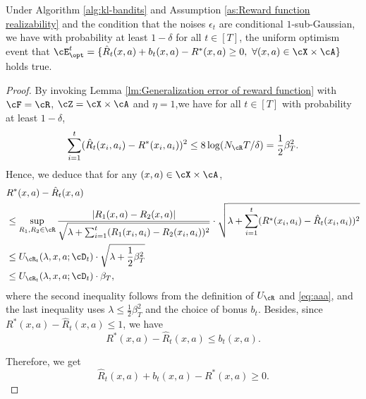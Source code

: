 \documentclass[11pt]{article}
\begin{document}
\begin{lemma}\label{lm:Confidence Bound for Reward Function}
    Under Algorithm \ref{alg:kl-bandits} and Assumption \ref{as:Reward function realizability} and the condition that the noises $\epsilon_t$ are conditional $1$-sub-Gaussian, we have with probability at least $1-\delta$ for all $t\in[T]$, the uniform optimism event that $\cE_{\opt}^t=\{\hat{R}_t(x,a)+b_t(x,a)-R^*(x,a) \ge 0,~\forall(x,a)\in\cX\times\cA\}$ holds true.
\end{lemma}
\begin{proof}
By invoking Lemma \ref{lm:Generalization error of reward function} with $\cF=\cR$, $\cZ=\cX\times\cA$ and $\eta=1$,we have for all $t\in[T]$ with probability at least $1-\delta$,
    \begin{align}\label{eq:aaa}
        \sum_{i=1}^t(\hat{R}_t(x_i,a_i) - R^*(x_i,a_i))^2 \le 8\log(N_{\cR}T/\delta) = \frac{1}{2}\beta_T^2.
    \end{align}
Hence, we deduce that for any $(x,a)\in\cX\times\cA$,
\begin{align*}
    &R^*(x,a) - \hat{R}_t(x,a) \\&\le \sup_{R_1,R_2\in\cR}\frac{|R_1(x,a)-R_2(x,a)|}{\sqrt{\lambda+\sum_{i=1}^{t}(R_1(x_i,a_i)-R_2(x_i,a_i))^2}}\cdot\sqrt{\lambda+\sum_{i=1}^{t}(R^*(x_i,a_i) - \hat{R}_t(x_i,a_i))^2}\\
    &\le U_{\cR_{t}}(\lambda,x,a;\cD_{t})\cdot\sqrt{\lambda+\frac{1}{2}\beta_T^2}\\
    &\le U_{\cR_{t}}(\lambda,x,a;\cD_{t})\cdot\beta_T,
\end{align*}
where the second inequality follows from the definition of $U_{\cR}$ and \eqref{eq:aaa}, and the last inequality uses $\lambda\le\frac{1}{2}\beta_T^2$ and the choice of bonus $b_t$. Besides, since $R^*(x,a) - \hat{R}_t(x,a)\le 1$, we have
$$
R^*(x,a) - \hat{R}_t(x,a) \le b_t(x,a).
$$

Therefore, we get
$$
\hat{R}_t(x,a)+b_t(x,a)-R^*(x,a) \ge 0.
$$
\end{proof}
\end{document}
